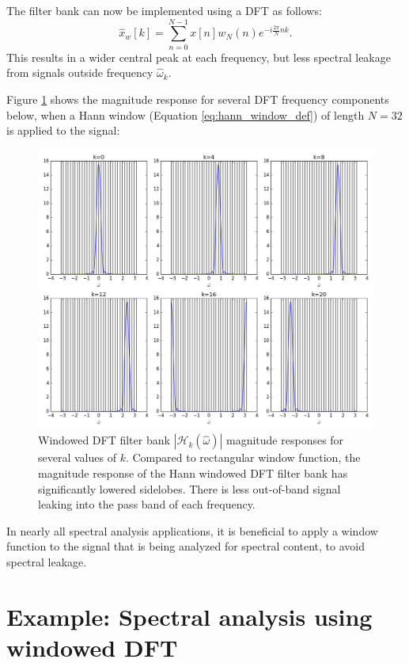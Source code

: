 The filter bank can now be implemented using a DFT as follows:
\begin{equation}
\boxed{
\hat{x}_w[k] = \sum_{n=0}^{N-1}x[n]w_N(n)e^{-i\frac{2\pi}{N}nk}.
}
\label{wdft}
\end{equation}
This results in a wider central peak at each frequency, but less
spectral leakage from signals outside frequency $\hat{\omega}_k$.

Figure \ref{fig:windowed_dft} shows the magnitude response
for several DFT frequency components below, when a Hann window
(Equation \ref{eq:hann_window_def}) of length $N=32$ is applied to the
signal:
\begin{figure}
\begin{center}
\includegraphics[width=\textwidth]{ch16/figures/fft_freqresp_w.png}
\end{center}
\caption{Windowed DFT filter bank $|\mathcal{H}_k(\hat{\omega})|$ magnitude responses for several values of $k$. 
Compared to rectangular window function, the magnitude response of the Hann windowed DFT filter bank has significantly lowered sidelobes. There is less out-of-band
signal leaking into the pass band of each frequency.}
\label{fig:windowed_dft}
\end{figure}

In nearly all spectral analysis applications, it is beneficial to
apply a window function to the signal that is being analyzed for
spectral content, to avoid spectral leakage.

\section{Example: Spectral analysis using windowed DFT}

